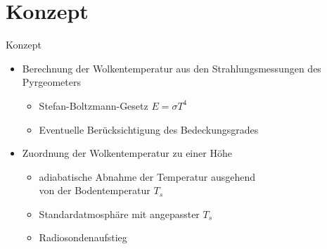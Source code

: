 \documentclass{beamer}
\begin{document}
\section{Konzept}
\begin{frame}{Konzept}
\begin{itemize}
  \vfill\item Berechnung der Wolkentemperatur aus den Strahlungsmessungen des Pyrgeometers
    \begin{itemize}
      \item Stefan-Boltzmann-Gesetz $E = \sigma T^4$
      \item Eventuelle Berücksichtigung des Bedeckungsgrades
    \end{itemize}
  \vfill\item Zuordnung der Wolkentemperatur zu einer Höhe
  \begin{itemize}
    \item adiabatische Abnahme der Temperatur ausgehend\\
          von der Bodentemperatur $T_s$
    \item Standardatmosphäre mit angepasster $T_s$
    \item Radiosondenaufstieg
  \end{itemize}
  \vfill
\end{itemize}
\end{frame}
\end{document}
